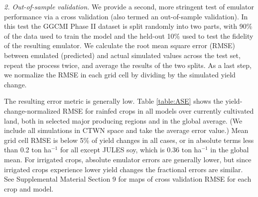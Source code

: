 \documentclass[gmd, manuscript]{copernicus} %
\begin{document}
\smallskip
\textit{2. Out-of-sample validation.} 
We provide a second, more stringent test of emulator performance via a cross validation (also termed an out-of-sample validation). 
In this test the GGCMI Phase II dataset is split randomly into two parts, with 90\% of the data used to train the model and the held-out 10\% used to test the fidelity of the resulting emulator.
We calculate the root mean square error (RMSE) between emulated (predicted) and actual simulated values across the test set, repeat the process twice, and average the results of the two splits. 
As a last step, we normalize the RMSE in each grid cell by dividing by the simulated yield change.

The resulting error metric is generally low.
Table \ref{table:ASE} shows the yield-change-normalized RMSE for rainfed crops in all models over currently cultivated land, both in selected major producing regions and in the global average. (We include all simulations in CTWN space and take the average error value.) 
Mean grid cell RMSE is below 5\% of yield changes in all cases, or in absolute terms 
less than 0.2 ton ha$^{-1}$ for all except JULES soy, which is 0.36 ton ha$^{-1}$ in the global mean.
For irrigated crops, absolute emulator errors are generally lower, but since irrigated crops experience lower yield changes the fractional errors are similar. 
See Supplemental Material Section 9 for maps of cross validation RMSE for each crop and model.
\end{document}
